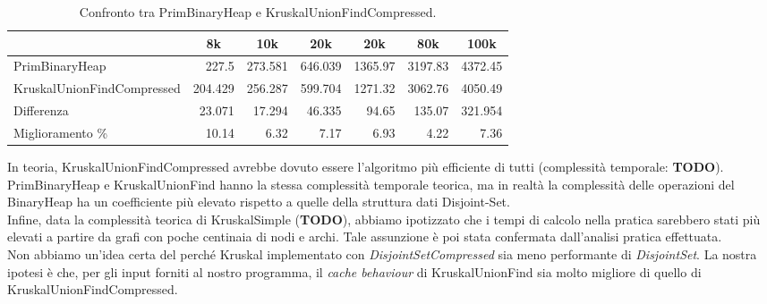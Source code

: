 \begin{table}[H]
\centering
    \begin{tabular}{|l|rrrrrr|}
    \hline
    &  \multicolumn{1}{c}{8k} & \multicolumn{1}{c}{10k} & \multicolumn{1}{c}{20k} & \multicolumn{1}{c}{20k} & \multicolumn{1}{c}{80k} &           \multicolumn{1}{c|}{100k} \\
    \hline
 PrimBinaryHeap             & 227.5   & 273.581 & 646.039 & 1365.97 & 3197.83 & 4372.45  \\
 KruskalUnionFindCompressed & 204.429 & 256.287 & 599.704 & 1271.32 & 3062.76 & 4050.49 \\ \hline
     Differenza                 &  23.071 &  17.294 &  46.335 &   94.65 &  135.07 &  321.954 \\
     Miglioramento \%              &  10.14  &   6.32  &   7.17  &    6.93 &    4.22 &    7.36  \\
    \hline
    \end{tabular}
    \caption{Confronto tra PrimBinaryHeap e KruskalUnionFindCompressed.}
    \label{table:prim-binary-heap-vs-kruskal-union-find-compressed}
\end{table}



\noindent In teoria, KruskalUnionFindCompressed avrebbe dovuto essere l'algoritmo più efficiente di tutti (complessità temporale: \textbf{TODO}).
\noindent PrimBinaryHeap e KruskalUnionFind hanno la stessa complessità temporale teorica, ma in realtà la complessità delle operazioni del BinaryHeap ha un coefficiente più elevato rispetto a quelle della struttura dati Disjoint-Set. \\

\noindent Infine, data la complessità teorica di KruskalSimple (\textbf{TODO}), abbiamo ipotizzato che i tempi di calcolo nella pratica sarebbero stati più elevati a partire da grafi con poche centinaia di nodi e archi. Tale assunzione è poi stata confermata dall'analisi pratica effettuata. \\

\noindent Non abbiamo un'idea certa del perché Kruskal implementato con \textit{DisjointSetCompressed} sia meno performante di \textit{DisjointSet}. La nostra ipotesi è che, per gli input forniti al nostro programma, il \textit{cache behaviour} di KruskalUnionFind sia molto migliore di quello di KruskalUnionFindCompressed.
